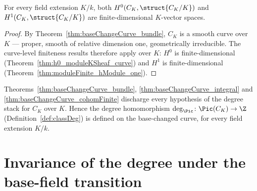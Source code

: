 \begin{theorem}
  \label{thm:baseChangeCurve_cohomFinite}
  \leanok
  For every field extension \(K/k\), both \(H^0(C_K, \struct{C_K/K})\) and \(H^1(C_K,
  \struct{C_K/K})\) are finite-dimensional \(K\)-vector spaces.
\end{theorem}
\begin{proof}
  \leanok
  By Theorem~\ref{thm:baseChangeCurve_bundle}, \(C_K\) is a smooth curve over \(K\) --- proper,
  smooth of relative dimension one, geometrically irreducible. The curve-level finiteness results
  therefore apply over \(K\): \(H^0\) is finite-dimensional
  (Theorem~\ref{thm:h0_moduleKSheaf_curve}) and \(H^1\) is finite-dimensional
  (Theorem~\ref{thm:moduleFinite_hModule_one}).
\end{proof}

\begin{remark}
  \label{rem:classDeg_baseChange}
  \leanok
  Theorems~\ref{thm:baseChangeCurve_bundle}, \ref{thm:baseChangeCurve_integral} and
  \ref{thm:baseChangeCurve_cohomFinite} discharge every hypothesis of the degree stack for \(C_K\)
  over \(K\). Hence the degree homomorphism \(\deg_{\Pic} \colon \Pic(C_K) \to \Z\)
  (Definition~\ref{def:classDeg}) is defined on the base-changed curve, for every field extension
  \(K/k\).
\end{remark}

\section{Invariance of the degree under the base-field transition}
\label{sec:degree_base_field_invariance}


